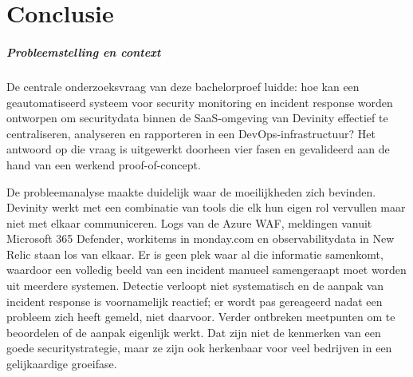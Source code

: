 
\chapter{Conclusie}%
\label{ch:conclusie}


\paragraph{Probleemstelling en context}
De centrale onderzoeksvraag van deze bachelorproef luidde: hoe kan een geautomatiseerd systeem voor security monitoring en incident response worden ontworpen om securitydata binnen de SaaS-omgeving van Devinity effectief te centraliseren, analyseren en rapporteren in een DevOps-infrastructuur? Het antwoord op die vraag is uitgewerkt doorheen vier fasen en gevalideerd aan de hand van een werkend proof-of-concept.

De probleemanalyse maakte duidelijk waar de moeilijkheden zich bevinden. Devinity werkt met een combinatie van tools die elk hun eigen rol vervullen maar niet met elkaar communiceren. Logs van de Azure WAF, meldingen vanuit Microsoft 365 Defender, workitems in monday.com en observabilitydata in New Relic staan los van elkaar. Er is geen plek waar al die informatie samenkomt, waardoor een volledig beeld van een incident manueel samengeraapt moet worden uit meerdere systemen. Detectie verloopt niet systematisch en de aanpak van incident response is voornamelijk reactief; er wordt pas gereageerd nadat een probleem zich heeft gemeld, niet daarvoor. Verder ontbreken meetpunten om te beoordelen of de aanpak eigenlijk werkt. Dat zijn niet de kenmerken van een goede securitystrategie, maar ze zijn ook herkenbaar voor veel bedrijven in een gelijkaardige groeifase.

